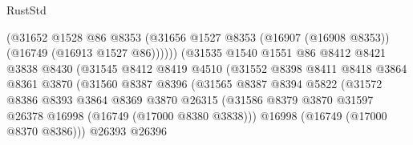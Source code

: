 \begin{lexlean}{RustStd}
\begin{coremodule}
                                      (@31652
                                        @1528
                                        @86
                                        @8353
                                        (@31656
                                          @1527
                                          @8353
                                          (@16907 (@16908 @8353))
                                          (@16749 (@16913 @1527 @86))))))
                                  (@31535
                                    @1540
                                    @1551
                                    @86
                                    @8412
                                    @8421
                                    @3838
                                    @8430
                                    (@31545
                                      @8412
                                      @8419
                                      @4510
                                      (@31552
                                        @8398
                                        @8411
                                        @8418
                                        @3864
                                        @8361
                                        @3870
                                        (@31560
                                          @8387
                                          @8396
                                          (@31565
                                            @8387
                                            @8394
                                            @5822
                                            (@31572
                                              @8386
                                              @8393
                                              @3864
                                              @8369
                                              @3870
                                              @26315
                                              (@31586
                                                @8379
                                                @3870
                                                @31597
                                                @26378
                                                @16998
                                                (@16749 (@17000 @8380 @3838)))
                                              @16998
                                              (@16749 (@17000 @8370 @8386)))
                                            @26393
                                            @26396

\end{coremodule}
\end{lexlean}
